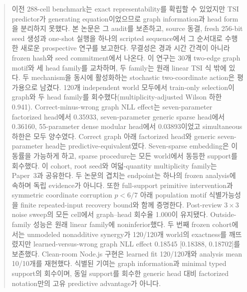 \begin{abstract}
이전 288-cell benchmark는 exact representability를 확립할 수 있었지만 TSI
predictor가 generating equation이었으므로 graph information과 head form을
분리하지 못했다. 본 논문은 그 audit를 보존하고, source 동결, fresh 256-bit seed
생성과 one-shot 실행을 하나의 scripted sequence에서 그 순서대로 수행한 새로운
prospective 연구를 보고한다. 무결성은 경과 시간 간격이 아니라 frozen hash와 seed
commitment에서 나온다.
이 연구는 30개 two-edge graph motif와 세 head family를 교차하며, 두 family는
원래 linear TSI 식 밖에 있다. 두 mechanism을 동시에 활성화하는 stochastic
two-coordinate action은 평가용으로 남겼다. 120개 independent world 모두에서
train-only selection이 graph와 두 head family를 회수했다(multiplicity-adjusted
Wilson 하한 0.941). Correct-minus-wrong graph NLL effect는 seven-parameter
factorized head에서 0.35933, seven-parameter generic sparse head에서 0.36160,
55-parameter dense modular head에서 0.03893이었고 simultaneous 하한은 모두
양수였다. Correct graph 아래 factorized head와 generic seven-parameter head는
predictive-equivalent였다. Seven-sparse embedding은 이 동률을 가능하게 하고,
sparse procedure는 모든 world에서 동등한 support를 회수했다. 이 cohort, root seed와
여덟-quantity multiplicity family는 Paper~3과 공유한다. 두 논문의 겹치는 endpoint는
하나의 frozen analysis에 속하며 독립 evidence가 아니다. 또한 full-support primitive
intervention과 symmetric coordinate corruption \(p<6/7\) 아래 population motif
식별가능성을 finite repeated-input recovery bound와 함께 증명한다. Post-review
\(3\times3\) noise sweep의 모든 cell에서 graph--head 회수율 1.000이 유지됐다.
Outside-family
성능은 원래 linear family에 noninferior했다. 두 번째 frozen cohort에서는
unmodeled nonadditive synergy가 120/120개 world의 exactness를 깨뜨렸지만
learned-versus-wrong graph NLL effect 0.18545 [0.18388, 0.18702]를 보존했다.
Clean-room Node.js 구현은 learned fit 120/120개와 analysis mean 10/10개를
재현했다. 식별된 기여는 graph information과
minimal typed support의 회수이며, 동일 support를 회수한 generic head 대비
factorized notation만의 고유 predictive advantage가 아니다.
\end{abstract}

